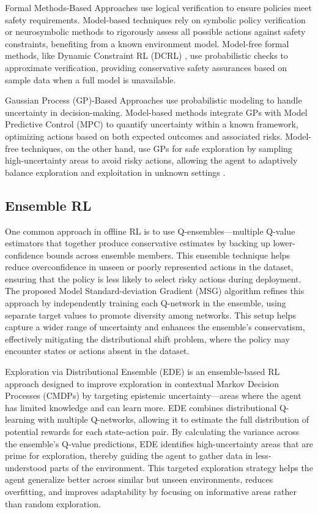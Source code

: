 Formal Methods-Based Approaches  use logical verification to ensure policies meet safety requirements. Model-based techniques rely on symbolic policy verification or neurosymbolic methods \cite{anderson2020neurosymbolic} to rigorously assess all possible actions against safety constraints, benefiting from a known environment model. Model-free formal methods, like Dynamic Constraint RL (DCRL) \cite{qin2021density}, use probabilistic checks to approximate verification, providing conservative safety assurances based on sample data when a full model is unavailable.

Gaussian Process (GP)-Based Approaches use probabilistic modeling to handle uncertainty in decision-making. Model-based methods integrate GPs with Model Predictive Control (MPC) \cite{zanon2020safe} to quantify uncertainty within a known framework, optimizing actions based on both expected outcomes and associated risks. Model-free techniques, on the other hand, use GPs for safe exploration by sampling high-uncertainty areas to avoid risky actions, allowing the agent to adaptively balance exploration and exploitation in unknown settings \cite{sui2015safe}.


\subsection{Ensemble RL}
One common approach in offline RL is to use Q-ensembles—multiple Q-value estimators that together produce conservative estimates by backing up lower-confidence bounds across ensemble members. This ensemble technique helps reduce overconfidence in unseen or poorly represented actions in the dataset, ensuring that the policy is less likely to select risky actions during deployment. The proposed Model Standard-deviation Gradient (MSG) algorithm refines this approach by independently training each Q-network in the ensemble, using separate target values to promote diversity among networks. This setup helps capture a wider range of uncertainty and enhances the ensemble's conservatism, effectively mitigating the distributional shift problem, where the policy may encounter states or actions absent in the dataset\cite{ghasemipour2022so}.

Exploration via Distributional Ensemble (EDE) is an ensemble-based RL approach designed to improve exploration in contextual Markov Decision Processes (CMDPs) by targeting epistemic uncertainty—areas where the agent has limited knowledge and can learn more\cite{jiang2024importance}. EDE combines distributional Q-learning with multiple Q-networks, allowing it to estimate the full distribution of potential rewards for each state-action pair. By calculating the variance across the ensemble's Q-value predictions, EDE identifies high-uncertainty areas that are prime for exploration, thereby guiding the agent to gather data in less-understood parts of the environment. This targeted exploration strategy helps the agent generalize better across similar but unseen environments, reduces overfitting, and improves adaptability by focusing on informative areas rather than random exploration.



